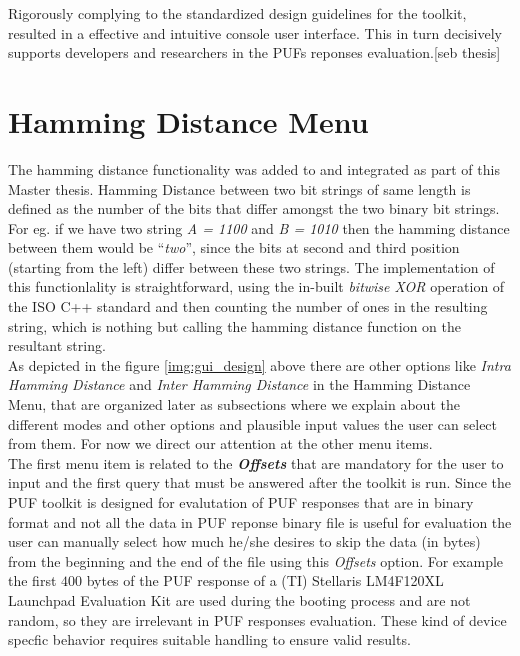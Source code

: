 Rigorously complying to the standardized design guidelines for the toolkit, resulted in a effective and intuitive console user interface.
This in turn decisively supports developers and researchers in the PUFs reponses evaluation.[seb thesis]

\section{Hamming Distance Menu}

The hamming distance functionality was added to and integrated as part of this Master thesis. Hamming Distance between two bit strings of same length is defined as the number of the bits that differ amongst the two binary bit strings. For eg. if we have two string \emph{A = 1100} and \emph{B = 1010} then the hamming distance between them would be ``\emph{two}'', since the bits at second and third position (starting from the left) differ between these two strings. The implementation of
this functionlality is straightforward, using the in-built \emph{bitwise XOR} operation of the ISO C++ standard and then counting the number of ones in the resulting string, which is nothing but calling the hamming distance function on the resultant string.\\

As depicted in the figure \ref{img:gui_design} above there are other options like \emph{Intra Hamming Distance} and \emph{Inter Hamming Distance} in the Hamming Distance Menu, that are organized later as subsections where we explain about the different modes and other options and plausible input values the user can select from them. For now we direct our attention at the other menu items.\\

The first menu item is related to the \emph{\textbf{Offsets}} that are mandatory for the user to input and the first query that must be answered after the toolkit is run. Since the PUF toolkit is designed for evalutation of PUF responses that are in binary format and not all the data in PUF reponse binary file is useful for evaluation the user can manually select how much he/she desires to skip the data (in bytes) from the beginning and the end of the file using this \emph{Offsets} option.
For example the first $400$ bytes of the PUF response of a (TI) Stellaris LM4F120XL Launchpad Evaluation Kit are used during the booting process and are not random, so they are irrelevant in PUF responses evaluation. These kind of device specfic behavior requires suitable handling to ensure valid results.\\

